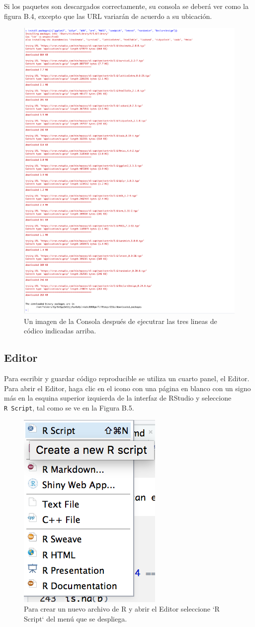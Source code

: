 \documentclass[12pt,spanish,]{book}
\begin{document}
Si los paquetes son descargados correctamente, su consola se deberá ver como la figura B.4, excepto que las URL variarán de acuerdo a su ubicación.

\begin{figure}
\includegraphics[width=0.4\linewidth]{Images/console2a} \caption{Un imagen de la Consola después de ejecutrar las tres lineas de códico indicadas arriba.}\label{fig:console2}
\end{figure}

\hypertarget{editor}{%
\subsection{Editor}\label{editor}}

Para escribir y guardar código reproducible se utiliza un cuarto panel, el Editor. Para abrir el Editor, haga clic en el icono con una página en blanco con un signo más en la esquina superior izquierda de la interfaz de RStudio y seleccione \texttt{R\ Script}, tal como se ve en la Figura B.5.

\begin{figure}
\includegraphics[width=0.6\linewidth]{Images/new_script} \caption{Para crear un nuevo archivo de R y abrir el Editor seleccione `R Script` del menú que se despliega.}\label{fig:newscript}
\end{figure}
\end{document}

